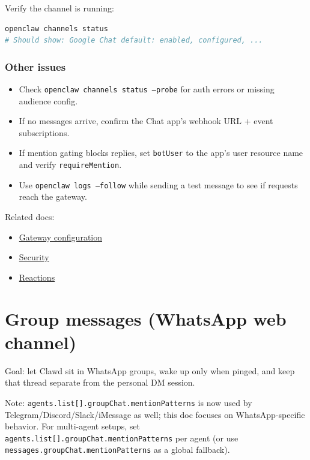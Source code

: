 Verify the channel is running:

\begin{lstlisting}[language=bash]
openclaw channels status
# Should show: Google Chat default: enabled, configured, ...
\end{lstlisting}


\subsubsection{Other issues}


\begin{itemize}
  \item Check \texttt{openclaw channels status --probe} for auth errors or missing audience config.
  \item If no messages arrive, confirm the Chat app's webhook URL + event subscriptions.
  \item If mention gating blocks replies, set \texttt{botUser} to the app's user resource name and verify \texttt{requireMention}.
  \item Use \texttt{openclaw logs --follow} while sending a test message to see if requests reach the gateway.
\end{itemize}


Related docs:

\begin{itemize}
  \item \href{/gateway/configuration}{Gateway configuration}
  \item \href{/gateway/security}{Security}
  \item \href{/tools/reactions}{Reactions}
\end{itemize}



\clearpage

\section{Group messages (WhatsApp web channel)}


Goal: let Clawd sit in WhatsApp groups, wake up only when pinged, and keep that thread separate from the personal DM session.

Note: \texttt{agents.list[].groupChat.mentionPatterns} is now used by Telegram/Discord/Slack/iMessage as well; this doc focuses on WhatsApp-specific behavior. For multi-agent setups, set \texttt{agents.list[].groupChat.mentionPatterns} per agent (or use \texttt{messages.groupChat.mentionPatterns} as a global fallback).


